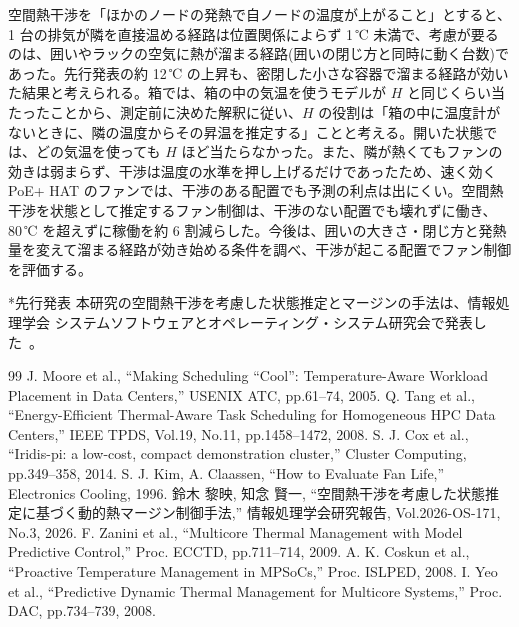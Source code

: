 \documentclass[10pt,uplatex,dvipdfmx,twocolumn]{jsarticle}
\makeatletter
\renewcommand{\section}{\@startsection{section}{1}{\z@}{0.6\Cvs \@plus.3\Cdp}{0.3\Cvs}{\normalfont\large\headfont\raggedright}}
\makeatother
\begin{document}
\section{考察とまとめ}
空間熱干渉を「ほかのノードの発熱で自ノードの温度が上がること」とすると、1 台の排気が隣を直接温める経路は位置関係によらず 1\,℃ 未満で、考慮が要るのは、囲いやラックの空気に熱が溜まる経路(囲いの閉じ方と同時に動く台数)であった。先行発表の約 12\,℃ の上昇も、密閉した小さな容器で溜まる経路が効いた結果と考えられる。箱では、箱の中の気温を使うモデルが $H$ と同じくらい当たったことから、測定前に決めた解釈に従い、$H$ の役割は「箱の中に温度計がないときに、隣の温度からその昇温を推定する」ことと考える。開いた状態では、どの気温を使っても $H$ ほど当たらなかった。また、隣が熱くてもファンの効きは弱まらず、干渉は温度の水準を押し上げるだけであったため、速く効く PoE+ HAT のファンでは、干渉のある配置でも予測の利点は出にくい。空間熱干渉を状態として推定するファン制御は、干渉のない配置でも壊れずに働き、80\,℃ を超えずに稼働を約 6 割減らした。今後は、囲いの大きさ・閉じ方と発熱量を変えて溜まる経路が効き始める条件を調べ、干渉が起こる配置でファン制御を評価する。

\section*{先行発表}
本研究の空間熱干渉を考慮した状態推定とマージンの手法は、情報処理学会 システムソフトウェアとオペレーティング・システム研究会で発表した~\cite{ipsj}。

\scriptsize{
\begin{thebibliography}{99}
  \setlength{\itemsep}{0pt}
   J. Moore et al., ``Making Scheduling ``Cool'': Temperature-Aware Workload Placement in Data Centers,'' USENIX ATC, pp.61--74, 2005.
   Q. Tang et al., ``Energy-Efficient Thermal-Aware Task Scheduling for Homogeneous HPC Data Centers,'' IEEE TPDS, Vol.19, No.11, pp.1458--1472, 2008.
   S. J. Cox et al., ``Iridis-pi: a low-cost, compact demonstration cluster,'' Cluster Computing, pp.349--358, 2014.
   S. J. Kim, A. Claassen, ``How to Evaluate Fan Life,'' Electronics Cooling, 1996.
   鈴木 黎映, 知念 賢一, ``空間熱干渉を考慮した状態推定に基づく動的熱マージン制御手法,'' 情報処理学会研究報告, Vol.2026-OS-171, No.3, 2026.
   F. Zanini et al., ``Multicore Thermal Management with Model Predictive Control,'' Proc. ECCTD, pp.711--714, 2009.
   A. K. Coskun et al., ``Proactive Temperature Management in MPSoCs,'' Proc. ISLPED, 2008.
   I. Yeo et al., ``Predictive Dynamic Thermal Management for Multicore Systems,'' Proc. DAC, pp.734--739, 2008.
\end{thebibliography}
}
\end{document}
